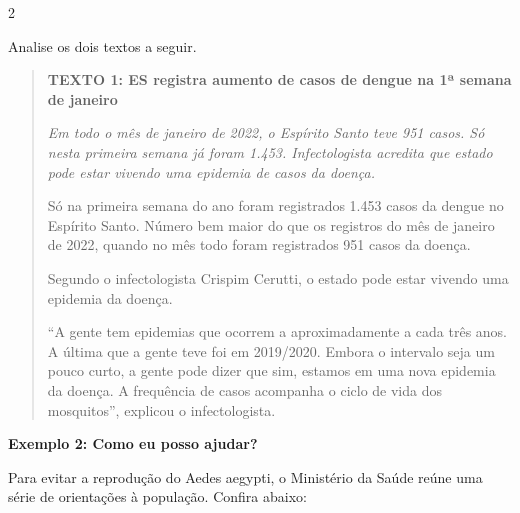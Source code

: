 \num{2}

Analise os dois textos a seguir.

\begin{quote}

\textbf{TEXTO 1: ES registra aumento de casos de dengue na 1ª semana de janeiro}

\textit{Em todo o mês de janeiro de 2022, o Espírito Santo teve 951
casos. Só nesta primeira semana já foram 1.453. Infectologista acredita
que estado pode estar vivendo uma epidemia de casos da doença.}

Só na primeira semana do ano foram registrados 1.453 casos da dengue no
Espírito Santo. Número bem maior do que os registros do mês de janeiro
de 2022, quando no mês todo foram registrados 951 casos da doença.

Segundo o infectologista Crispim Cerutti, o estado pode estar vivendo
uma epidemia da doença.

``A gente tem epidemias que ocorrem a aproximadamente a cada três anos. A
última que a gente teve foi em 2019/2020. Embora o intervalo seja um
pouco curto, a gente pode dizer que sim, estamos em uma nova epidemia da
doença. A frequência de casos acompanha o ciclo de vida dos mosquitos'',
explicou o infectologista.

\end{quote}


\textbf{Exemplo 2: Como eu posso ajudar?}

Para evitar a reprodução do Aedes aegypti, o Ministério da Saúde reúne
uma série de orientações à população. Confira abaixo:

